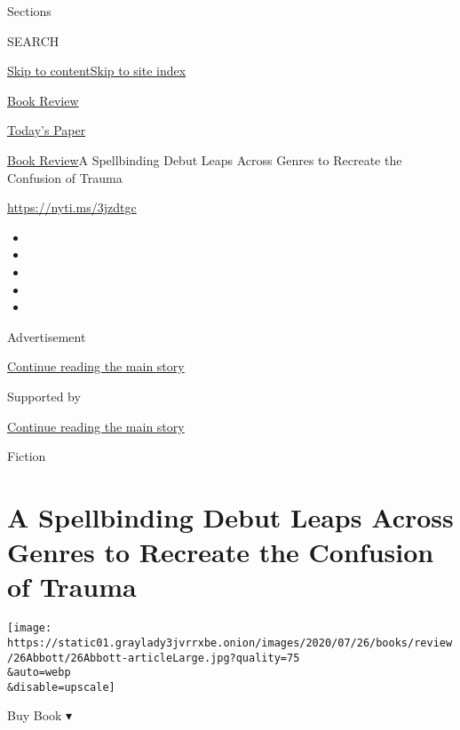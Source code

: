 Sections

SEARCH

\protect\hyperlink{site-content}{Skip to
content}\protect\hyperlink{site-index}{Skip to site index}

\href{https://www.nytimes3xbfgragh.onion/section/books/review}{Book
Review}

\href{https://myaccount.nytimes3xbfgragh.onion/auth/login?response_type=cookie\&client_id=vi}{}

\href{https://www.nytimes3xbfgragh.onion/section/todayspaper}{Today's
Paper}

\href{/section/books/review}{Book Review}\textbar{}A Spellbinding Debut
Leaps Across Genres to Recreate the Confusion of Trauma

\url{https://nyti.ms/3jzdtgc}

\begin{itemize}
\item
\item
\item
\item
\item
\end{itemize}

Advertisement

\protect\hyperlink{after-top}{Continue reading the main story}

Supported by

\protect\hyperlink{after-sponsor}{Continue reading the main story}

Fiction

\hypertarget{a-spellbinding-debut-leaps-across-genres-to-recreate-the-confusion-of-trauma}{%
\section{A Spellbinding Debut Leaps Across Genres to Recreate the
Confusion of
Trauma}\label{a-spellbinding-debut-leaps-across-genres-to-recreate-the-confusion-of-trauma}}

\texttt{[image: https://static01.graylady3jvrrxbe.onion/images/2020/07/26/books/review/26Abbott/26Abbott-articleLarge.jpg?quality=75\\\&auto=webp\\\&disable=upscale]}

Buy Book ▾

